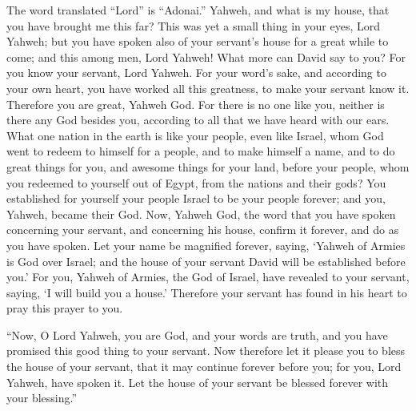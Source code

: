 {{The word translated “Lord” is “Adonai.”} Yahweh, and what is my house, that you have brought me this far?
This was yet a small thing in your eyes, Lord Yahweh; but you have spoken also of your servant’s house for a great while to come; and this among men, Lord Yahweh!
What more can David say to you? For you know your servant, Lord Yahweh.
For your word’s sake, and according to your own heart, you have worked all this greatness, to make your servant know it.
Therefore you are great, Yahweh God. For there is no one like you, neither is there any God besides you, according to all that we have heard with our ears.
What one nation in the earth is like your people, even like Israel, whom God went to redeem to himself for a people, and to make himself a name, and to do great things for you, and awesome things for your land, before your people, whom you redeemed to yourself out of Egypt, from the nations and their gods?
You established for yourself your people Israel to be your people forever; and you, Yahweh, became their God.
Now, Yahweh God, the word that you have spoken concerning your servant, and concerning his house, confirm it forever, and do as you have spoken.
Let your name be magnified forever, saying, ‘Yahweh of Armies is God over Israel; and the house of your servant David will be established before you.’
For you, Yahweh of Armies, the God of Israel, have revealed to your servant, saying, ‘I will build you a house.’ Therefore your servant has found in his heart to pray this prayer to you.
\par }{\PP {}“Now, O Lord Yahweh, you are God, and your words are truth, and you have promised this good thing to your servant.
Now therefore let it please you to bless the house of your servant, that it may continue forever before you; for you, Lord Yahweh, have spoken it. Let the house of your servant be blessed forever with your blessing.”

}
